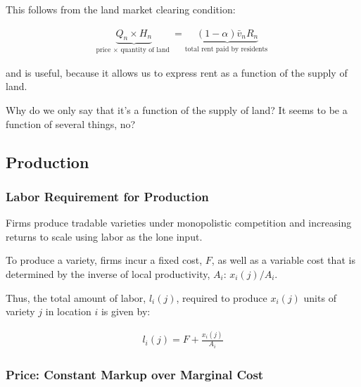 \documentclass[10pt]{article}
\begin{document}
This follows from the land market clearing condition:

\begin{align}
    \underbrace{Q_n \times H_n}_{\text {price } \times \text { quantity of land }}=\underbrace{(1-\alpha) \bar{v}_n R_n}_{\text {total rent paid by residents }} \label{eq:land_market_clearing}
\end{align}

and is useful, because it allows us to express 
rent as a function of the supply of land.

\begin{questions}
    Why do we only say that it's a function of the supply of land?
    It seems to be a function of several things, no?
\end{questions}



\subsection{Production}

\subsubsection{Labor Requirement for Production}

Firms produce tradable varieties under 
monopolistic competition
and increasing returns to scale
using labor as the lone input. 

To produce a variety, firms incur 
a fixed cost, $F$, as well as a 
variable cost
that is determined by the inverse 
of local productivity, $A_i$: $x_i(j)/A_i$.

Thus, the total amount of labor, $l_i(j)$, required to produce
$x_i(j)$ units of variety $j$ in location $i$ is
given by:

\begin{align}
    l_i(j)=F+ \frac{x_i(j)}{A_i} \label{eq:labor_requirement}
\end{align}

\subsubsection{Price: Constant Markup over Marginal Cost}
\end{document}
